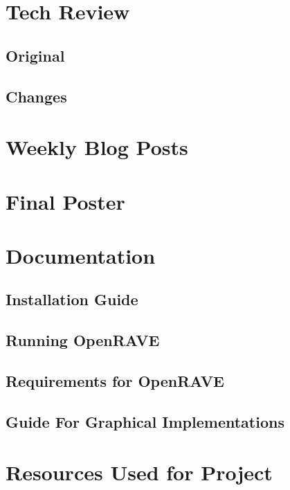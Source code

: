 \documentclass[10pt,journal,compsoc,draftclsnofoot]{IEEEtran}
\begin{document}
\begin{flushleft}
\section{Tech Review}

\subsection{Original}


\subsection{Changes}




\section{Weekly Blog Posts}



\section{Final Poster}



\section{Documentation}

\subsection{Installation Guide}

\subsection{Running OpenRAVE}

\subsection{Requirements for OpenRAVE}

\subsection{Guide For Graphical Implementations}


\section{Resources Used for Project}




\end{flushleft}
\end{document}
